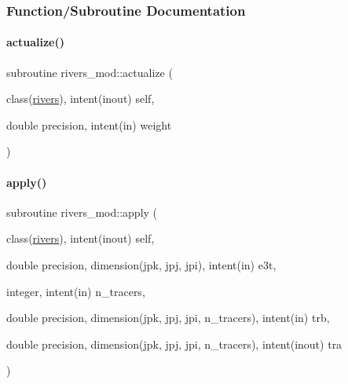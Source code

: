 \subsubsection{Function/\+Subroutine Documentation}
\mbox{\label{namespacerivers__mod_a75772a76ea5f75ae4e5b10ff9d01b606}} 
\paragraph{\texorpdfstring{actualize()}{actualize()}}
{\footnotesize\ttfamily subroutine rivers\+\_\+mod\+::actualize (\begin{DoxyParamCaption}\item[{class(\mbox{\hyperlink{structrivers__mod_1_1rivers}{rivers}}), intent(inout)}]{self,  }\item[{double precision, intent(in)}]{weight }\end{DoxyParamCaption})\hspace{0.3cm}{\ttfamily [private]}}

\mbox{\label{namespacerivers__mod_a020814a802ff4a0fe8f51652fd0e6479}} 
\paragraph{\texorpdfstring{apply()}{apply()}}
{\footnotesize\ttfamily subroutine rivers\+\_\+mod\+::apply (\begin{DoxyParamCaption}\item[{class(\mbox{\hyperlink{structrivers__mod_1_1rivers}{rivers}}), intent(inout)}]{self,  }\item[{double precision, dimension(jpk, jpj, jpi), intent(in)}]{e3t,  }\item[{integer, intent(in)}]{n\+\_\+tracers,  }\item[{double precision, dimension(jpk, jpj, jpi, n\+\_\+tracers), intent(in)}]{trb,  }\item[{double precision, dimension(jpk, jpj, jpi, n\+\_\+tracers), intent(inout)}]{tra }\end{DoxyParamCaption})\hspace{0.3cm}{\ttfamily [private]}}

\mbox{\label{namespacerivers__mod_afea9ef8cef5df5fafc3e107c2f3b0244}} 
